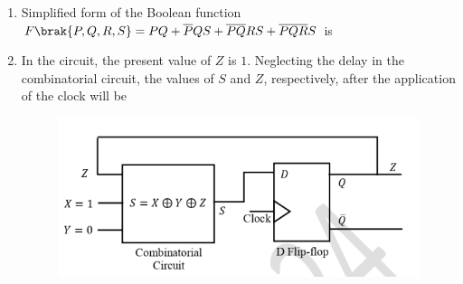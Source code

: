 \documentclass[journal,12pt,onecolumn]{IEEEtran}
\theoremstyle{remark}
\begin{document}
\begin{enumerate}[start=1, label=Q.\arabic*]
    \hfill{}

    \item Simplified form of the Boolean function $F\brak{P,Q,R,S} = PQ + \overline{P}QS + \overline{P}\overline{Q}RS + \overline{P}\overline{Q}\overline{R}S$ is
    \begin{enumerate}
    \end{enumerate}

    \hfill{}

    \item In the circuit, the present value of $Z$ is $1$. Neglecting the delay in the combinatorial circuit, the values of $S$ and $Z$, respectively, after the application of the clock will be
    \begin{figure}[H]
        \centering
        \includegraphics[width=0.6\columnwidth]{Figures/q25.png}
        \caption{}
    \end{figure}
    \begin{enumerate}
    \end{enumerate}

    \hfill{}


\end{enumerate}
\end{document}
